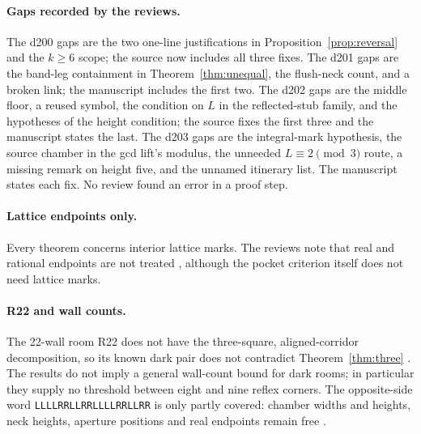 \documentclass[11pt]{article}
\theoremstyle{definition}
\theoremstyle{remark}
\begin{document}
\paragraph{Gaps recorded by the reviews.} The d200 gaps are the two one-line
justifications in Proposition~\ref{prop:reversal} and the $k\ge 6$ scope; the
source now includes all three fixes. The d201 gaps are the band-leg containment
in Theorem~\ref{thm:unequal}, the flush-neck count, and a broken link; the
manuscript includes the first two. The d202 gaps are the middle floor, a reused
symbol, the condition on $L$ in the reflected-stub family, and the hypotheses of
the height condition; the source fixes the first three and the manuscript states
the last. The d203 gaps are the integral-mark hypothesis, the source chamber in
the gcd lift's modulus, the unneeded $L\equiv 2\pmod 3$ route, a missing
remark on height five, and the unnamed itinerary list. The manuscript states each
fix. No review found an error in a proof step.

\paragraph{Lattice endpoints only.} Every theorem concerns interior lattice
marks. The reviews note that real and rational endpoints are not treated
\cite{d201,d202,d203}, although the pocket criterion itself does not need
lattice marks.

\paragraph{R22 and wall counts.} The 22-wall room R22 does not have the
three-square, aligned-corridor decomposition, so its known dark pair does not
contradict Theorem~\ref{thm:three} \cite{R1}. The results do not imply a
general wall-count bound for dark rooms; in particular they supply no threshold
between eight and nine reflex corners. The opposite-side word
\texttt{LLLLRRLLRRLLLLRRLLRR} is only partly covered: chamber widths and heights,
neck heights, aperture positions and real endpoints remain free \cite{d201,d202}.
\end{document}
